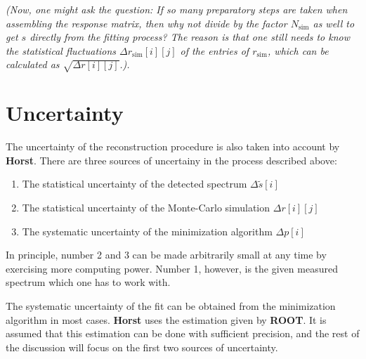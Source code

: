 \documentclass{article}
\begin{document}
\textit{(Now, one might ask the question: If so many preparatory steps are taken when assembling the response matrix, then why not divide by the factor $N_\mathrm{sim}$ as well to get $s$ directly from the fitting process?
The reason is that one still needs to know the statistical fluctuations $\Delta r_\mathrm{sim}[i][j]$ of the entries of $r_\mathrm{sim}$, which can be calculated as $\sqrt{ \Delta r[i][j] }$.).}


\section{Uncertainty}
\label{Uncertainty}

The uncertainty of the reconstruction procedure is also taken into account by \textbf{Horst}.
There are three sources of uncertainy in the process described above:

\begin{enumerate}
	\item The statistical uncertainty of the detected spectrum $\Delta \tilde{s}[i]$
	\item The statistical uncertainty of the Monte-Carlo simulation $\Delta r[i][j]$
	\item The systematic uncertainty of the minimization algorithm $\Delta p[i]$
\end{enumerate}

In principle, number 2 and 3 can be made arbitrarily small at any time by exercising more computing power. Number 1, however, is the given measured spectrum which one has to work with.

The systematic uncertainty of the fit can be obtained from the minimization algorithm in most cases.
\textbf{Horst} uses the estimation given by \textbf{ROOT}.
It is assumed that this estimation can be done with sufficient precision, and the rest of the discussion will focus on the first two sources of uncertainty.
\end{document}
